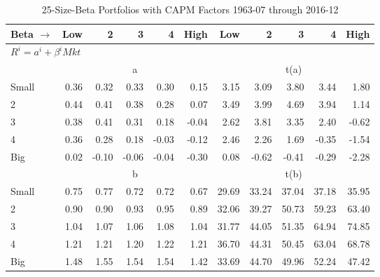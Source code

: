 
\begin{table}[!ht]
\centering
\caption{25-Size-Beta Portfolios with CAPM Factors 1963-07 through 2016-12}
\begin{tabular}{lrrrrrrrrrr}
  \toprule
    Beta $\rightarrow$ & Low & 2 & 3 & 4 & High & Low & 2 & 3 & 4 & High \\ 
  \midrule
  \multicolumn{11}{l}{$R^i=a^i+\beta^iMkt$} \\

  
    
      & \multicolumn{5}{c}{a} & \multicolumn{5}{c}{t(a)}
    
    \\
      \cmidrule(r){2-6} \cmidrule(r){7-11}

    Small   & 0.36  & 0.32  & 0.33  & 0.30  & 0.15  & 3.15  & 3.09  & 3.80  & 3.44  & 1.80  \\
         2  & 0.44  & 0.41  & 0.38  & 0.28  & 0.07  & 3.49  & 3.99  & 4.69  & 3.94  & 1.14  \\
         3  & 0.38  & 0.41  & 0.31  & 0.18  & -0.04  & 2.62  & 3.81  & 3.35  & 2.40  & -0.62  \\
         4  & 0.36  & 0.28  & 0.18  & -0.03  & -0.12  & 2.46  & 2.26  & 1.69  & -0.35  & -1.54  \\
    Big     & 0.02  & -0.10  & -0.06  & -0.04  & -0.30  & 0.08  & -0.62  & -0.41  & -0.29  & -2.28  \\

  
    
      & \multicolumn{5}{c}{b} & \multicolumn{5}{c}{t(b)}
    
    \\
      \cmidrule(r){2-6} \cmidrule(r){7-11}

    Small   & 0.75  & 0.77  & 0.72  & 0.72  & 0.67  & 29.69  & 33.24  & 37.04  & 37.18  & 35.95  \\
         2  & 0.90  & 0.90  & 0.93  & 0.95  & 0.89  & 32.06  & 39.27  & 50.73  & 59.23  & 63.40  \\
         3  & 1.04  & 1.07  & 1.06  & 1.08  & 1.04  & 31.77  & 44.05  & 51.35  & 64.94  & 74.85  \\
         4  & 1.21  & 1.21  & 1.20  & 1.22  & 1.21  & 36.70  & 44.31  & 50.45  & 63.04  & 68.78  \\
    Big     & 1.48  & 1.55  & 1.54  & 1.54  & 1.42  & 33.69  & 44.70  & 49.96  & 52.24  & 47.42  \\

  

  \bottomrule
\end{tabular}
\label{tbl:25_Size_Beta_CAPM}
\end{table}